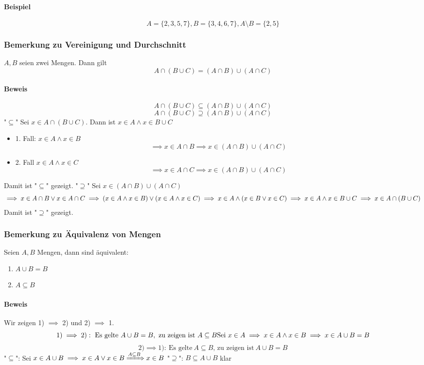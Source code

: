 \documentclass[a4paper]{scrartcl}
\theoremstyle{definition}
\theoremstyle{plain}
\theoremstyle{plain}
\theoremstyle{remark}
\theoremstyle{remark}
\theoremstyle{remark}
\theoremstyle{remark}
\theoremstyle{remark}
\begin{document}
\paragraph{Beispiel}
\label{sec-2-4-8-1}
\[A=\{2,3,5,7\}, B=\{3,4,6,7\}, A\setminus B = \{2,5\}\]
\subsubsection{Bemerkung zu Vereinigung und Durchschnitt}
\label{sec-2-4-9}
$A,B$ seien zwei Mengen. Dann gilt \[A\cap (B\cup C) = (A\cap B) \cup (A\cap C)\]
\paragraph{Beweis}
\label{sec-2-4-9-1}
\[A\cap(B\cup C) \subseteq (A\cap B) \cup (A\cap C)\]
\[A\cap(B\cup C) \supseteq (A\cap B) \cup (A\cap C)\]
"$\subseteq$" Sei $x\in A \cap (B\cup C)$. Dann ist $x\in A \wedge x\in B\cup C$
\begin{itemize}
\item 1. Fall: $x\in A \wedge x\in B$
       \[\implies x\in A\cap B \implies x \in (A\cap B) \cup (A\cap C)\]
\item 2. Fall $x\in A \wedge x\in C$
       \[\implies x\in A\cap C \implies x\in (A\cap B)\cup(A\cap C)\]
\end{itemize}
Damit ist "$\subseteq$" gezeigt.
"$\supseteq$" Sei $x\in (A\cap B) \cup (A\cap C)$
\[\implies x\in A\cap B \vee x\in A\cap C \\ \implies (x\in A \wedge x\in B) \vee (x\in A \wedge x\in C) \\ \implies x\in A \wedge (x\in B\vee x\in C) \\ \implies x\in A \wedge x\in B\cup C \\ \implies x\in A\cap (B\cup C)\]
Damit ist "$\supseteq$" gezeigt.
\subsubsection{Bemerkung zu Äquivalenz von Mengen}
\label{sec-2-4-10}
Seien $A,B$ Mengen, dann sind äquivalent:
\begin{enumerate}
\item $A\cup B = B$
\item $A\subseteq B$
\end{enumerate}
\paragraph{Beweis}
\label{sec-2-4-10-1}
Wir zeigen 1) $\implies$ 2) und 2) $\implies$ 1.
\[1) \implies 2):~\text{Es gelte}~A\cup B = B,~\text{zu zeigen ist}~A\subseteq B \\ \text{Sei}~x\in A \implies x\in A \wedge x \in B \implies x\in A\cup B = B\]
\[2) \implies 1):~\text{Es gelte}~A\subseteq B\text{, zu zeigen ist}~A\cup B = B \]
"$\subseteq$": Sei $x\in A\cup B \implies x\in A \vee x\in B \xRightarrow{A\subseteq B} x\in B$
"$\supseteq$": $B\subseteq A\cup B$ klar
\end{document}
